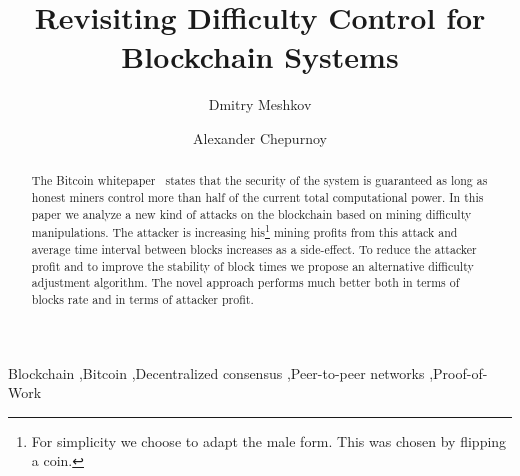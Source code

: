 \documentclass[number,preprint,review]{elsarticle}
\begin{document}
\begin{frontmatter}



\title{Revisiting Difficulty Control for Blockchain Systems}



\author[iohk]{Dmitry Meshkov}
\address[iohk]{IOHK Research}

\author[iohk]{Alexander Chepurnoy}

\begin{abstract}

The Bitcoin whitepaper~\cite{Nakamoto2008} states that the security of the system is guaranteed as long as honest miners control more than half of the current total computational power.
In this paper we analyze a new kind of attacks on the blockchain based on mining difficulty manipulations.
The attacker is increasing his\footnote{For simplicity we choose to adapt the male form. This was chosen by flipping a coin.} mining profits from this attack and average time interval between blocks increases as a side-effect.
To reduce the attacker profit and to improve the stability of block times we propose an alternative difficulty adjustment algorithm.
The novel approach performs much better both in terms of blocks rate and in terms of attacker profit.

\end{abstract}

\begin{keyword}
Blockchain \sep Bitcoin \sep Decentralized consensus \sep Peer-to-peer networks \sep Proof-of-Work
\end{keyword}

\end{frontmatter}
\end{document}
